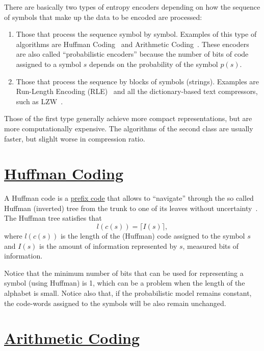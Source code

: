 There are basically two types of entropy encoders depending on how the
sequence of symbols that make up the data to be encoded are processed:

\begin{enumerate}
\item Those that process the sequence symbol by symbol. Examples of
  this type of algorithms are Huffman
  Coding~\cite{vruiz__huffman_coding} and Arithmetic
  Coding~\cite{vruiz__arithmetic_coding}. These encoders are also
  called ``probabilistic encoders'' because the number of bits of code
  assigned to a symbol $s$ depends on the probability of the symbol
  $p(s)$.
\item Those that process the sequence by blocks of symbols
  (strings). Examples are Run-Length Encoding (RLE)~\cite{vruiz__rle}
  and all the dictionary-based text compressors, such as
  LZW~\cite{vruiz__LZW}.
\end{enumerate}
  
Those of the first type generally achieve more compact
representations, but are more computationally expensive. The
algorithms of the second class are usually faster, but slighlt worse
in compression ratio.

\section{\href{https://en.wikipedia.org/wiki/Huffman_coding}{Huffman Coding}}

A Huffman code is a
\href{https://en.wikipedia.org/wiki/Prefix_code}{prefix code} that
allows to ``navigate'' through the so called Huffman (inverted) tree
from the trunk to one of its leaves without
uncertainty~\cite{vruiz__huffman_coding}. The Huffman tree satisfies that
\begin{equation}
  l(c(s)) = \lceil I(s)\rceil,
  \label{eq:huffman_performance}
\end{equation}
where $l(c(s))$ is the length of the (Huffman) code assigned to the
symbol $s$ and $I(s)$ is the amount of information represented by $s$,
measured bits of information.

Notice that the minimum number of bits that can be used for
representing a symbol (using Huffman) is 1, which can be a problem
when the length of the alphabet is small. Notice also that, if the
probabilistic model remains constant, the code-words assigned to the
symbols will be also remain unchanged.

\section{\href{https://en.wikipedia.org/wiki/Arithmetic_coding}{Arithmetic Coding}}

